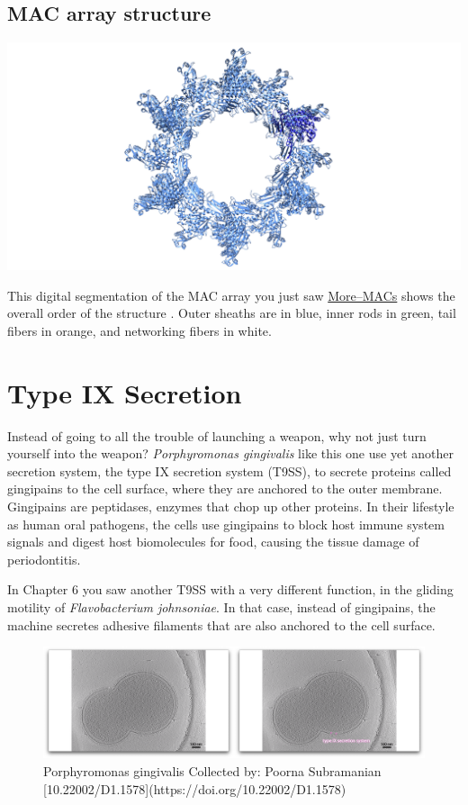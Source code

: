 \documentclass[]{tufte-book}
\begin{document}
\subsection{MAC array structure}\label{MAC_array_structure}

\includegraphics{img/schematics/9_7_1}

This digital segmentation of the MAC array you just saw
\protect\hyperlink{moremacs}{More--MACs} shows the overall order of the
structure \citet{shikuma2014}. Outer sheaths are in blue, inner rods in
green, tail fibers in orange, and networking fibers in white.

\section{Type IX Secretion}\label{type-ix-secretion}

Instead of going to all the trouble of launching a weapon, why not just
turn yourself into the weapon? \emph{Porphyromonas gingivalis} like this
one use yet another secretion system, the type IX secretion system
(T9SS), to secrete proteins called gingipains to the cell surface, where
they are anchored to the outer membrane. Gingipains are peptidases,
enzymes that chop up other proteins. In their lifestyle as human oral
pathogens, the cells use gingipains to block host immune system signals
and digest host biomolecules for food, causing the tissue damage of
periodontitis.

In Chapter 6 you saw another T9SS with a very different function, in the
gliding motility of \emph{Flavobacterium johnsoniae}. In that case,
instead of gingipains, the machine secretes adhesive filaments that are
also anchored to the cell surface.

\begin{figure}
\includegraphics{movie_stills/9_8} \caption[Porphyromonas gingivalis Collected by]{Porphyromonas gingivalis Collected by: Poorna Subramanian [10.22002/D1.1578](https://doi.org/10.22002/D1.1578)}\label{fig:unnamed-chunk-168}
\end{figure}
\end{document}
